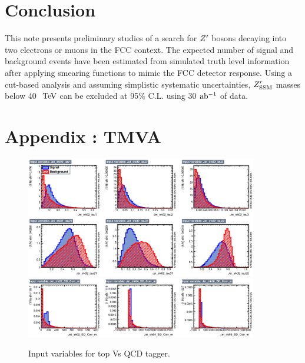 \documentclass{cernrep}
\begin{document}
\clearpage
\newpage

\section{Conclusion}
This note presents preliminary studies of a search for $Z^{\prime}$ 
bosons decaying into two electrons or muons in the FCC context. The expected number 
of signal and background events have been estimated from simulated truth level information 
after applying smearing functions to mimic the FCC detector response.
Using a cut-based analysis and assuming simplistic systematic uncertainties, $Z^{\prime}_{\mathrm{SSM}}$
masses below 40 $\TeV$ can be excluded at 95$\%$ C.L. 
using 30 $\mbox{ab$^{-1}$}{}$ of data. 
\clearpage
\newpage

\appendix

\section{ Appendix : TMVA}
\label{appendix:tmva}

\begin{figure}[!htb]\centering
\includegraphics[width=0.9\textwidth]{Fig/TMVA/thad_vs_QCD/variables_id_c1.eps}
\includegraphics[width=0.9\textwidth]{Fig/TMVA/thad_vs_QCD/variables_id_c2.eps}
\caption{Input variables for top Vs QCD tagger.}
\label{fig:TMVA_inputs_t}
\end{figure}
\end{document}
